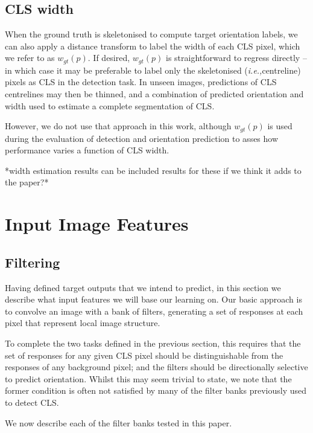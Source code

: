 \documentclass{IEEEtran}
\def\ie{\emph{i.e.,}}
\begin{document}
\subsection{CLS width}
\label{s:output_width}
When the ground truth is skeletonised to compute target orientation labels, we can also apply a distance transform to label the width of each CLS pixel, which we refer to as $w_{gt}(p)$. If desired, $w_{gt}(p)$ is straightforward to regress directly -- in which case it may be preferable to label only the skeletonised (\ie centreline) pixels as CLS in the detection task. In unseen images, predictions of CLS centrelines may then be thinned, and a combination of predicted orientation and width used to estimate a complete segmentation of CLS.

However, we do not use that approach in this work, although $w_{gt}(p)$ is used during the evaluation of detection and orientation prediction to asses how performance varies a function of CLS width.

*width estimation results can be included results for these if we think it adds to the paper?*

\section{Input Image Features}
\subsection{Filtering}
\label{s:filtering}

Having defined target outputs that we intend to predict, in this section we describe what input features we will base our learning on. Our basic approach is to convolve an image with a bank of filters, generating a set of responses at each pixel that represent local image structure.

To complete the two tasks defined in the previous section, this requires that the set of responses for any given CLS pixel should be distinguishable from the responses of any background pixel; and the filters should be directionally selective to predict orientation. Whilst this may seem trivial to state, we note that the former condition is often not satisfied by many of the filter banks previously used to detect CLS.

We now describe each of the filter banks tested in this paper.
\end{document}
